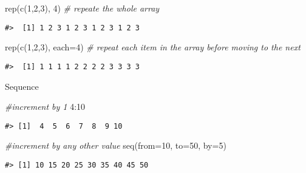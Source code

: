 \documentclass[
]{book}
\newenvironment{Shaded}{\begin{snugshade}}{\end{snugshade}}
\newcommand{\AttributeTok}[1]{\textcolor[rgb]{0.77,0.63,0.00}{#1}}
\newcommand{\CommentTok}[1]{\textcolor[rgb]{0.56,0.35,0.01}{\textit{#1}}}
\newcommand{\DecValTok}[1]{\textcolor[rgb]{0.00,0.00,0.81}{#1}}
\newcommand{\FunctionTok}[1]{\textcolor[rgb]{0.00,0.00,0.00}{#1}}
\newcommand{\NormalTok}[1]{#1}
\newcommand{\SpecialCharTok}[1]{\textcolor[rgb]{0.00,0.00,0.00}{#1}}
\begin{document}
\begin{Shaded}
\begin{Highlighting}[]
\FunctionTok{rep}\NormalTok{(}\FunctionTok{c}\NormalTok{(}\DecValTok{1}\NormalTok{,}\DecValTok{2}\NormalTok{,}\DecValTok{3}\NormalTok{), }\DecValTok{4}\NormalTok{) }\CommentTok{\# repeate the whole array}
\end{Highlighting}
\end{Shaded}

\begin{verbatim}
#>  [1] 1 2 3 1 2 3 1 2 3 1 2 3
\end{verbatim}

\begin{Shaded}
\begin{Highlighting}[]
\FunctionTok{rep}\NormalTok{(}\FunctionTok{c}\NormalTok{(}\DecValTok{1}\NormalTok{,}\DecValTok{2}\NormalTok{,}\DecValTok{3}\NormalTok{), }\AttributeTok{each=}\DecValTok{4}\NormalTok{) }\CommentTok{\# repeat each item in the array before moving to the next}
\end{Highlighting}
\end{Shaded}

\begin{verbatim}
#>  [1] 1 1 1 1 2 2 2 2 3 3 3 3
\end{verbatim}

Sequence

\begin{Shaded}
\begin{Highlighting}[]
\CommentTok{\#increment by 1}
\DecValTok{4}\SpecialCharTok{:}\DecValTok{10}
\end{Highlighting}
\end{Shaded}

\begin{verbatim}
#> [1]  4  5  6  7  8  9 10
\end{verbatim}

\begin{Shaded}
\begin{Highlighting}[]
\CommentTok{\#increment by any other value}
\FunctionTok{seq}\NormalTok{(}\AttributeTok{from=}\DecValTok{10}\NormalTok{, }\AttributeTok{to=}\DecValTok{50}\NormalTok{, }\AttributeTok{by=}\DecValTok{5}\NormalTok{)}
\end{Highlighting}
\end{Shaded}

\begin{verbatim}
#> [1] 10 15 20 25 30 35 40 45 50
\end{verbatim}
\end{document}

